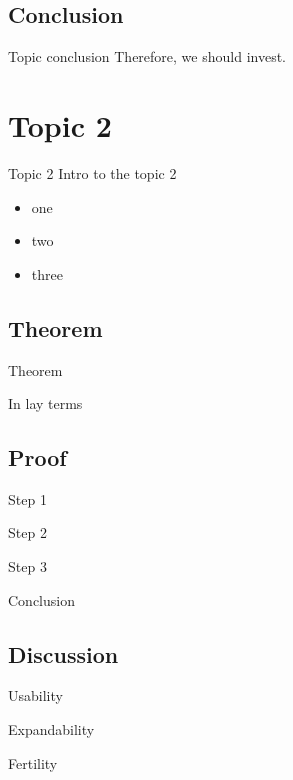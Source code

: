 \documentclass[presentation]{beamer}
\begin{document}
\subsection{Conclusion}
\label{sec:org9ef9514}
\begin{frame}[label={sec:org0466919}]{Topic conclusion}
Therefore, we should invest.
\end{frame}

\section{Topic 2}
\label{sec:orgccd5baa}
\begin{frame}[label={sec:org236b21a}]{Topic 2}
Intro to the topic 2
\begin{itemize}
\item one
\item two
\item three
\end{itemize}
\end{frame}
\subsection{Theorem}
\label{sec:org24c514a}
\begin{frame}[label={sec:org3ce258e}]{Theorem}
\end{frame}
\begin{frame}[label={sec:org3f025b6}]{In lay terms}
\end{frame}
\subsection{Proof}
\label{sec:org4a08ccd}
\begin{frame}[label={sec:orgb069d41}]{Step 1}
\end{frame}
\begin{frame}[label={sec:org6b99fa0}]{Step 2}
\end{frame}
\begin{frame}[label={sec:org1c77c5e}]{Step 3}
\end{frame}
\begin{frame}[label={sec:org231a2d9}]{Conclusion}
\end{frame}
\subsection{Discussion}
\label{sec:orge501ba2}
\begin{frame}[label={sec:org946a665}]{Usability}
\end{frame}
\begin{frame}[label={sec:orgf59d356}]{Expandability}
\end{frame}
\begin{frame}[label={sec:org5a3de95}]{Fertility}
\end{frame}
\end{document}
